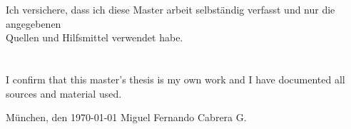 \clearemptydoublepage


\thispagestyle{empty}
	\vspace*{0.7\textheight}
        \noindent
	Ich versichere, dass ich diese Master arbeit selbst{\"a}ndig verfasst und nur 
	die angegebenen \\Quellen und Hilfsmittel verwendet habe.
        \\ \\ \\ 
       I confirm that this master's thesis is my own work and I have documented all sources and
       material used.    
	
	\vspace{11mm}
	\noindent
	M{\"u}nchen, den \today \hspace{5cm} Miguel Fernando Cabrera G.
\newpage